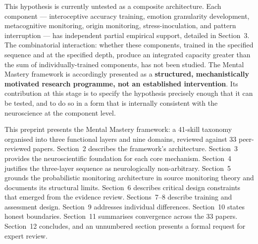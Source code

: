 \documentclass[12pt, a4paper]{article}
\begin{document}
This hypothesis is currently untested as a composite architecture. Each
component --- interoceptive accuracy training, emotion granularity development,
metacognitive monitoring, origin monitoring, stress-inoculation, and pattern
interruption --- has independent partial empirical support, detailed in
Section~3. The combinatorial interaction: whether these components, trained in
the specified sequence and at the specified depth, produce an integrated capacity
greater than the sum of individually-trained components, has not been studied.
The Mental Mastery framework is accordingly presented as a \textbf{structured,
mechanistically motivated research programme, not an established intervention}.
Its contribution at this stage is to specify the hypothesis precisely enough
that it can be tested, and to do so in a form that is internally consistent with
the neuroscience at the component level.

This preprint presents the Mental Mastery framework: a 41-skill taxonomy organised
into three functional layers and nine domains, reviewed against 33 peer-reviewed
papers. Section~2 describes the framework's architecture. Section~3 provides the
neuroscientific foundation for each core mechanism. Section~4 justifies the
three-layer sequence as neurologically non-arbitrary. Section~5 grounds the
probabilistic monitoring architecture in source monitoring theory and documents its structural
limits. Section~6 describes critical design constraints that emerged from the
evidence review. Sections~7--8 describe training and assessment design. Section~9
addresses individual differences. Section~10 states honest boundaries. Section~11
summarises convergence across the 33 papers. Section~12 concludes, and an
unnumbered section presents a formal request for expert review.
\end{document}
